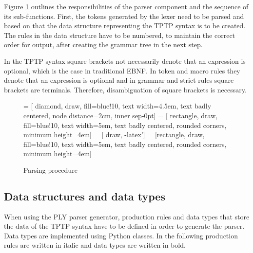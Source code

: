 Figure \ref{fig:ConceptParserFlow} outlines the responsibilities of the parser component and the sequence of its sub-functions.
First, the tokens generated by the lexer need to be parsed and based on that the data structure representing the \ac{TPTP} syntax is to be created.
The rules in the data structure have to be numbered, to maintain the correct order for output, after creating the grammar tree in the next step.

In the \ac{TPTP} syntax square brackets not necessarily denote that an expression is optional, which is the case in traditional \ac{EBNF}.
In token and macro rules they denote that an expression is optional and in grammar and strict rules square brackets are terminals.
Therefore, disambiguation of square brackets is necessary.
\begin{figure}[H]
 = [ diamond, draw, fill=blue!10, text width=4.5em, text badly centered, node distance=2cm, inner sep-0pt]  
 = [ rectangle, draw, fill=blue!10, text width=5em, text badly centered, rounded corners, minimum height=4em]  
 = [ draw, -latex']  
 = [rectangle, draw, fill=blue!10, text width=5em, text badly centered, rounded corners, minimum height=4em]  
\begin{center}
\end{center}
\caption{Parsing procedure}
\label{fig:ConceptParserFlow}
\end{figure}

\subsection{Data structures and data types}\label{sec:ConceptParserDataStructure}

When using the \ac{PLY} parser generator, production rules and data types that store the data of the \ac{TPTP} syntax have to be defined in order to generate the parser. Data types are implemented using Python classes. In the following production rules are written in italic and data types are written in bold.

